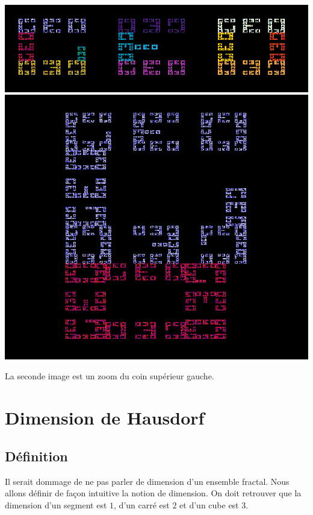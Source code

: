 \documentclass[11pt,class=report,crop=false]{standalone}
\begin{document}
\begin{center}
 \includegraphics[scale=.5]{images/IFS-geo1.png} \\[2mm]

 \includegraphics[scale=.2]{images/IFS-geo2.png} 
\end{center}
La seconde image est un zoom du coin supérieur gauche.


\section{Dimension de Hausdorf}


\subsection{Définition}

Il serait dommage de ne pas parler de dimension d'un ensemble fractal.
Nous allons définir de façon intuitive la notion de dimension.
On doit retrouver que la dimension d'un segment est $1$,
d'un carré est $2$ et d'un cube est $3$.
\end{document}
